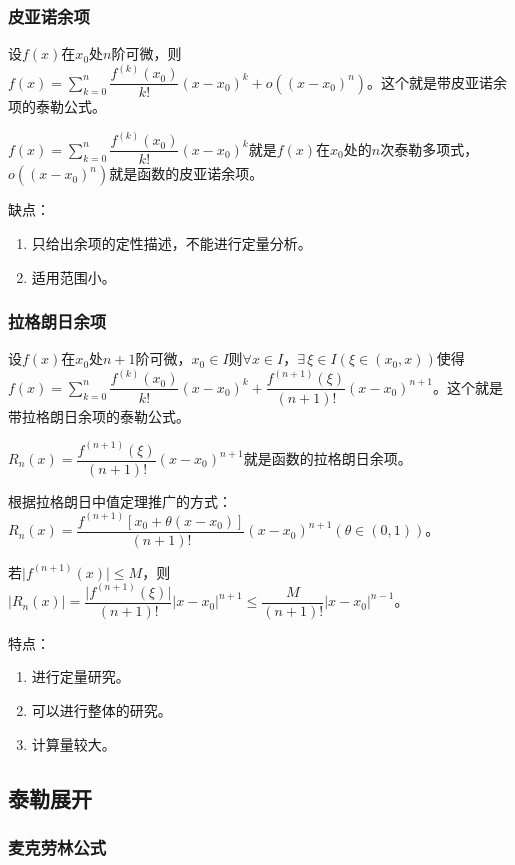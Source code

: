\documentclass[UTF8, 12pt]{ctexart}
\begin{document}
\subsubsection{皮亚诺余项}

设$f(x)$在$x_0$处$n$阶可微，则$f(x)=\sum_{k=0}^n\dfrac{f^{(k)}(x_0)}{k!}(x-x_0)^k+o((x-x_0)^n)$。这个就是带皮亚诺余项的泰勒公式。\medskip

$f(x)=\sum_{k=0}^n\dfrac{f^{(k)}(x_0)}{k!}(x-x_0)^k$就是$f(x)$在$x_0$处的$n$次泰勒多项式，$o((x-x_0)^n)$就是函数的皮亚诺余项。

缺点：

\begin{enumerate}
    \item 只给出余项的定性描述，不能进行定量分析。
    \item 适用范围小。
\end{enumerate}

\subsubsection{拉格朗日余项}

设$f(x)$在$x_0$处$n+1$阶可微，$x_0\in I$则$\forall x\in I$，$\exists\,\xi\in I(\xi\in(x_0,x))$使得$f(x)=\sum_{k=0}^n\dfrac{f^{(k)}(x_0)}{k!}(x-x_0)^k+\dfrac{f^{(n+1)}(\xi)}{(n+1)!}(x-x_0)^{n+1}$。这个就是带拉格朗日余项的泰勒公式。

$R_n(x)=\dfrac{f^{(n+1)}(\xi)}{(n+1)!}(x-x_0)^{n+1}$就是函数的拉格朗日余项。

根据拉格朗日中值定理推广的方式：$R_n(x)=\dfrac{f^{(n+1)}[x_0+\theta(x-x_0)]}{(n+1)!}(x-x_0)^{n+1}(\theta\in(0,1))$。

若$\vert f^{(n+1)}(x)\vert\leqslant M$，则$\vert R_n(x)\vert=\dfrac{\vert f^{(n+1)}(\xi)\vert}{(n+1)!}\vert x-x_0\vert^{n+1}\leqslant\dfrac{M}{(n+1)!}\vert x-x_0\vert^{n-1}$。

特点：

\begin{enumerate}
    \item 进行定量研究。
    \item 可以进行整体的研究。
    \item 计算量较大。
\end{enumerate}

\subsection{泰勒展开}

\subsubsection{麦克劳林公式}
\end{document}
